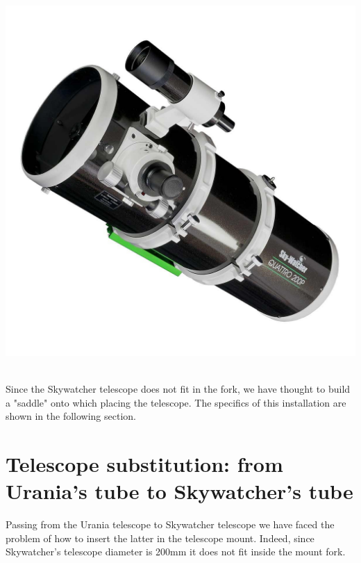 \documentclass{article}
\begin{document}
\begin{multicols}{2}
\begin{minipage}{0.5\textwidth}
            \includegraphics[scale=0.2]{newton-quattro-200-sky-watcher.jpg}
            \label{fig:skywatcher_telescope_mount}
        \end{minipage}
        \\
        Since the Skywatcher telescope does not fit in the fork, we have thought to build a "saddle" onto which placing the telescope.
        The specifics of this installation are shown in the following section.
         

        \section{Telescope substitution: from Urania's tube to Skywatcher's tube}
        Passing from the Urania telescope to Skywatcher telescope we have faced the problem of how to insert the latter in the telescope mount.
        Indeed, since Skywatcher's telescope diameter is 200mm it does not fit inside the mount fork.


\end{multicols}
\end{document}
